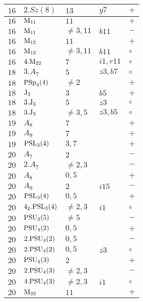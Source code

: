 \documentclass[a4paper, 11pt]{article}
\begin{document}
\begin{longtable}{lllll}
		$16$ & $2.Sz(8)$ & $13$ & $y7$ & $+$ \\ \hline
		$16$ & ${\rm M}_{11}$ & $11$ & & $+$ \\ \hline
		$16$ & ${\rm M}_{11}$ & $\neq 3,11$ & $b11$ & $-$ \\ \hline
		$16$ & ${\rm M}_{12}$ & $11$ & & $+$ \\ \hline
		$16$ & ${\rm M}_{12}$ & $\neq 3,11$ & $b11$ & $\circ$ \\ \hline
		$16$ & $4.{\rm M}_{22}$ & $7$ & $i1, r11$ & $\circ$ \\ \hline
		$18$ & $3.A_{7}$ & $5$ & $z3, b7$ & $\circ$ \\ \hline
		$18$ & ${\rm PSp}_{4}(4)$ & $\neq 2$ & & $+$ \\ \hline
		$18$ & ${\rm J}_3$ & $3$ & $b5$ & $+$ \\ \hline
		$18$ & $3.{\rm J}_3$ & $5$ & $z3$ & $\circ$ \\ \hline
		$18$ & $3.{\rm J}_3$ & $\neq 3,5$ & $z3, b5$ & $\circ$ \\ \hline
		$19$ & $A_{8}$ & $7$ & & $+$ \\ \hline
		$19$ & $A_{9}$ & $7$ & & $+$ \\ \hline
		$19$ & ${\rm PSL}_{3}(4)$ & $3, 7$ & & $+$ \\ \hline
		$20$ & $A_{7}$ & $2$ & & $-$ \\ \hline
		$20$ & $2.A_{7}$ & $\neq 2,3$ & & $-$ \\ \hline
		$20$ & $A_{8}$ & $0,5$ & & $+$ \\ \hline
		$20$ & $A_{9}$ & $2$ & $i15$ & $-$ \\ \hline
		$20$ & ${\rm PSL}_{3}(4)$ & $0,5$ & & $+$ \\ \hline
		$20$ & $4_2.{\rm PSL}_{3}(4)$ & $\neq 2,3$ & $i1$ & $\circ$ \\ \hline
		$20$ & ${\rm PSU}_{3}(5)$ & $\neq 5$ & & $-$ \\ \hline
		$20$ & ${\rm PSU}_{4}(2)$ & $0,5$ & & $+$ \\ \hline
		$20$ & $2.{\rm PSU}_{4}(2)$ & $0,5$ & & $-$ \\ \hline
		$20$ & $2.{\rm PSU}_{4}(2)$ & $0,5$ & $z3$ & $\circ$ \\ \hline
		$20$ & ${\rm PSU}_{4}(3)$ & $2$ & & $+$ \\ \hline
		$20$ & $2.{\rm PSU}_{4}(3)$ & $\neq 2,3$ & & $-$ \\ \hline
		$20$ & $4.{\rm PSU}_{4}(3)$ & $\neq 2,3$ & $i1$ & $\circ$ \\ \hline
		$20$ & ${\rm M}_{22}$ & $11$ & & $+$ \\ \hline

\end{longtable}
\end{document}
